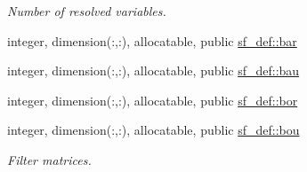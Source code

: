 \begin{DoxyCompactItemize}
\begin{DoxyCompactList}\small\item\em Number of resolved variables. \end{DoxyCompactList}\item 
integer, dimension(\+:,\+:), allocatable, public \hyperlink{namespacesf__def_ac5f61e46d21a461afc857f50b9c24899}{sf\+\_\+def\+::bar}
\item 
integer, dimension(\+:,\+:), allocatable, public \hyperlink{namespacesf__def_a3095931864a7ebf98dce2d5642031e58}{sf\+\_\+def\+::bau}
\item 
integer, dimension(\+:,\+:), allocatable, public \hyperlink{namespacesf__def_aa44fe776297bd93ef2a0c8a1457dbf41}{sf\+\_\+def\+::bor}
\item 
integer, dimension(\+:,\+:), allocatable, public \hyperlink{namespacesf__def_a349d2708598e0e0782cc21e8566208b5}{sf\+\_\+def\+::bou}
\begin{DoxyCompactList}\small\item\em Filter matrices. \end{DoxyCompactList}\end{DoxyCompactItemize}
